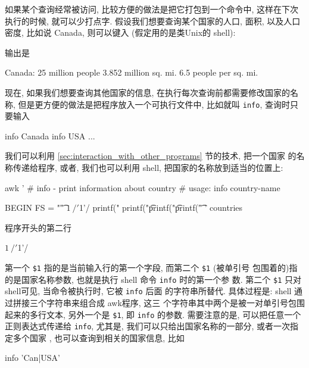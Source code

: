 如果某个查询经常被访问, 比较方便的做法是把它打包到一个命令中, 这样在下次
执行的时候, 就可以少打点字. 假设我们想要查询某个国家的人口, 面积, 以及人口
密度, 比如说 Canada, 则可以键入 (假定用的是类Unix的 shell):
输出是
\begin{awkcode}
    Canada:
        25 million people
        3.852 million sq. mi.
        6.5 people per sq. mi.
\end{awkcode}
现在, 如果我们想要查询其他国家的信息, 在执行每次查询前都需要修改国家的名称,
但是更方便的做法是把程序放入一个可执行文件中, 比如就叫 \verb'info',
查询时只要输入
\begin{awkcode}
    info Canada
    info USA
    ...
\end{awkcode}
我们可以利用
\ref{sec:interaction_with_other_programs}
 节的技术, 把一个国家
的名称传递给程序, 或者, 我们也可以利用 shell, 把国家的名称放到适当的位置上:
\begin{awkcode}
    awk '
    # info - print information about country
    #    usage: info country-name

    BEGIN { FS = "\t" }
    $1 ~ /'$1'/ {
        printf("%
        printf("\t%
        printf("\t%
        printf("\t%
    }
    ' countries
\end{awkcode}
程序开头的第二行
\begin{awkcode}
    $1 ~ /'$1'/
\end{awkcode}
第一个 \verb'$1' 指的是当前输入行的第一个字段, 而第二个 \verb'$1' (被单引号
包围着的)指的是国家名称参数, 也就是执行 shell 命令 \verb'info' 时的第一个参
数. 第二个 \verb'$1' 只对shell可见, 当命令被执行时, 它被 \verb'info' 后面
的字符串所替代. 具体过程是: shell 通过拼接三个字符串来组合成 awk程序, 这三
个字符串其中两个是被一对单引号包围起来的多行文本, 另外一个是 \verb'$1',
即 \texttt{info} 的参数. 需要注意的是, 可以把任意一个正则表达式传递给
\texttt{info}, 尤其是, 我们可以只给出国家名称的一部分, 或者一次指定多个国家
, 也可以查询到相关的国家信息, 比如
\begin{awkcode}
    info 'Can|USA'
\end{awkcode}

